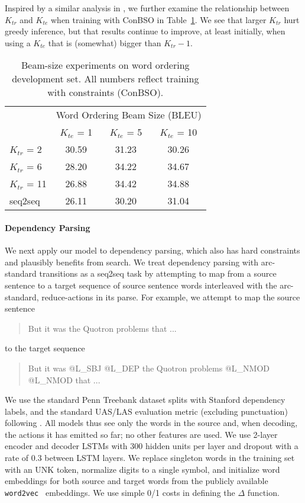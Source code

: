 Inspired by a similar analysis in , we further examine the relationship between $K_{tr}$ and $K_{te}$ when training with ConBSO in Table~\ref{tab:wosizeexp}. We see that larger $K_{tr}$ hurt greedy inference, but that results continue to improve, at least initially, when using a $K_{te}$ that is (somewhat) bigger than $K_{tr}-1$.
\begin{table}
  \centering
  \begin{tabular}{lccc}
    \toprule
    & \multicolumn{3}{c}{Word Ordering Beam Size (BLEU) } \\ 
    &  $K_{te}$ = 1 & $K_{te}$ = 5 & $K_{te}$ = 10 \\ 
    \midrule
    $K_{tr}$ = 2 & 30.59 & 31.23 & 30.26 \\
    $K_{tr}$ = 6 & 28.20 & 34.22 & 34.67 \\
    $K_{tr}$ = 11 & 26.88 & 34.42 & 34.88 \\   
    \midrule
    seq2seq & 26.11 & 30.20 & 31.04 \\         
    \bottomrule
  \end{tabular}
  \caption{Beam-size experiments on word ordering development set. All numbers reflect training with constraints (ConBSO).}
  \label{tab:wosizeexp}
\end{table}


\paragraph{Dependency Parsing}
We next apply our model to dependency parsing, which also has hard constraints and plausibly benefits from search. We treat dependency parsing with arc-standard transitions as a seq2seq task by attempting to map from a source sentence to a target sequence of source sentence words interleaved with the arc-standard, reduce-actions in its parse. For example, we attempt to map the source sentence \begin{quote}
But it was the Quotron problems that  ...
\end{quote} to the target sequence \begin{quote}
But it was @L\_SBJ @L\_DEP the Quotron problems @L\_NMOD @L\_NMOD that ...
\end{quote}
We use the standard Penn Treebank dataset splits with Stanford dependency labels, and the standard UAS/LAS evaluation metric (excluding punctuation) following  . All models thus see only the words in the source and, when decoding, the actions it has emitted so far; no other features are used. We use 2-layer encoder and decoder LSTMs with 300 hidden units per layer and dropout with a rate of 0.3 between LSTM layers. We replace singleton words in the training set with an UNK token, normalize digits to a single symbol, and initialize word embeddings for both source and target words from the publicly available \texttt{word2vec}~\cite{mikolov2013distributed} embeddings. We use simple 0/1 costs in defining the $\Delta$ function. 

